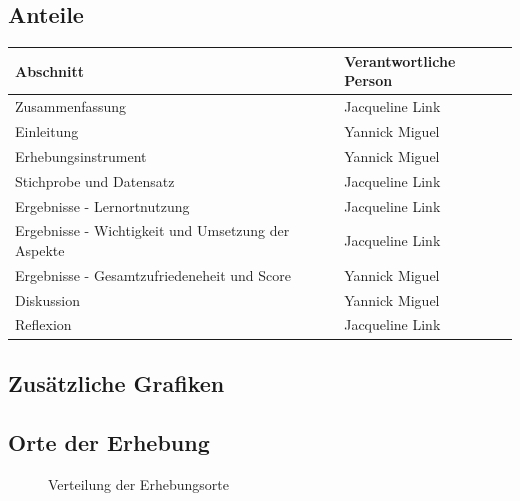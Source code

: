 \documentclass[11pt, a4paper]{article}
\begin{document}
\subsection{Anteile}
\begin{table}[h]
	\begin{tabular}{l|l}
		Abschnitt                                          & Verantwortliche Person \\ \hline
		Zusammenfassung                                    & Jacqueline Link        \\
		Einleitung                                         & Yannick Miguel         \\
		Erhebungsinstrument                                & Yannick Miguel         \\
		Stichprobe und Datensatz                           &
		Jacqueline Link        \\
		Ergebnisse - Lernortnutzung                        & Jacqueline Link        \\
		Ergebnisse - Wichtigkeit und Umsetzung der Aspekte & Jacqueline Link        \\
		Ergebnisse - Gesamtzufriedeneheit und Score        & Yannick Miguel         \\
		Diskussion                                         & Yannick Miguel         \\
		Reflexion                                          & Jacqueline Link       
	\end{tabular}
\end{table}
\subsection{Zusätzliche Grafiken}
\vspace{0.22cm}
\subsection*{Orte der Erhebung}
\begin{figure}[h]
	\centering
	
	\caption{Verteilung der Erhebungsorte}
\end{figure}
\newpage
\end{document}
